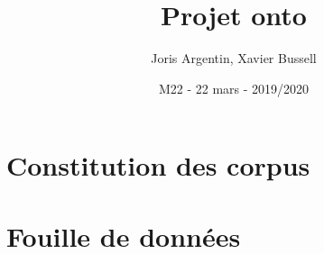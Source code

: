 \documentclass{article}
\title{Projet onto}
\author{Joris Argentin, Xavier Bussell}
\date{M22 - 22 mars - 2019/2020}
\begin{document}
\maketitle

\section{Constitution des corpus}

\section{Fouille de données}
\end{document}
